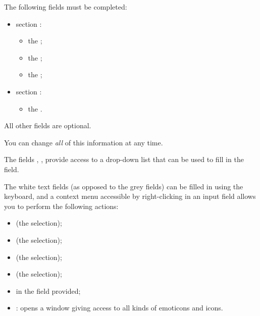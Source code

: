 The following fields must be completed:
\begin{itemize}
	\item section :
	\begin{itemize}
		\item the ;
		\item the ;
		\item the ;
	\end{itemize}
	\item section :
	\begin{itemize}
		\item the .
	\end{itemize}
\end{itemize}
All other fields are optional.


You can change \emph{all} of this information at any time.

The fields , ,  provide access to a drop-down list that can be used to fill in the field.

The white text fields (as opposed to the grey fields) can be filled in using the keyboard, and a context menu accessible by right-clicking in an input field allows you to perform the following actions:
\begin{itemize}
	\item {} (the selection);
	\item {} (the selection);
	\item {} (the selection);
	\item {} (the selection);
	\item {} in the field provided;
	\item {}: opens a window giving access to all kinds of emoticons and icons.
\end{itemize}


